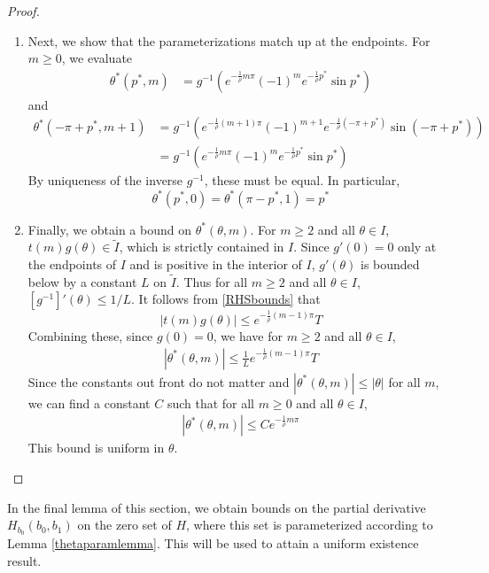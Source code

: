 \documentclass[thesis.tex]{subfiles}
\begin{document}
\begin{lemma}
\begin{proof}
\begin{enumerate}
\item Next, we show that the parameterizations match up at the endpoints. For $m \geq 0$, we evaluate
\begin{align*}
\theta^*(p^*, m) &= g^{-1}\left( e^{-\frac{1}{\rho}m \pi} (-1)^m e^{-\frac{1}{\rho}p^*} \sin p^* \right)
\end{align*}
and
\begin{align*}
\theta^*(-\pi + p^*, m+1) &= g^{-1}\left( e^{-\frac{1}{\rho}(m+1) \pi} (-1)^{m+1} e^{-\frac{1}{\rho}(-\pi + p^*)} \sin (-\pi + p^*) \right) \\
&=g^{-1}\left( e^{-\frac{1}{\rho}m \pi} (-1)^m e^{-\frac{1}{\rho}p^*} \sin p^* \right)
\end{align*}
By uniqueness of the inverse $g^{-1}$, these must be equal. In particular, 
\[
\theta^*(p^*, 0) = \theta^*(\pi - p^*, 1) = p^*
\]

\item Finally, we obtain a bound on $\theta^*(\theta, m)$. For $m \geq 2$ and all $\theta \in I$, $t(m)g(\theta) \in \tilde{I}$, which is strictly contained in $I$. Since $g'(0) = 0$ only at the endpoints of $I$ and is positive in the interior of $I$, $g'(\theta)$ is bounded below by a constant $L$ on $\tilde{I}$. Thus for all $m \geq 2$ and all $\theta \in I$, $[g^{-1}]'(\theta) \leq 1/L$. It follows from \cref{RHSbounds} that 
\[
|t(m)g(\theta)| \leq e^{-\frac{1}{\rho}(m - 1)\pi}T
\]
Combining these, since $g(0) = 0$, we have for $m \geq 2$ and all $\theta \in I$, 
\begin{align*}
|\theta^*(\theta, m)| \leq \frac{1}{L}e^{-\frac{1}{\rho}(m - 1)\pi}T
\end{align*}
Since the constants out front do not matter and $|\theta^*(\theta, m)| \leq |\theta|$ for all $m$, we can find a constant $C$ such that for all $m \geq 0$ and all $\theta \in I$,
\begin{align*}
|\theta^*(\theta, m)| \leq C e^{-\frac{1}{\rho} m \pi}
\end{align*}
This bound is uniform in $\theta$.
\end{enumerate}

\end{proof}
\end{lemma}

In the final lemma of this section, we obtain bounds on the partial derivative $H_{b_0} (b_0, b_1)$ on the zero set of $H$, where this set is parameterized according to Lemma \ref{thetaparamlemma}. This will be used to attain a uniform existence result.
\end{document}
